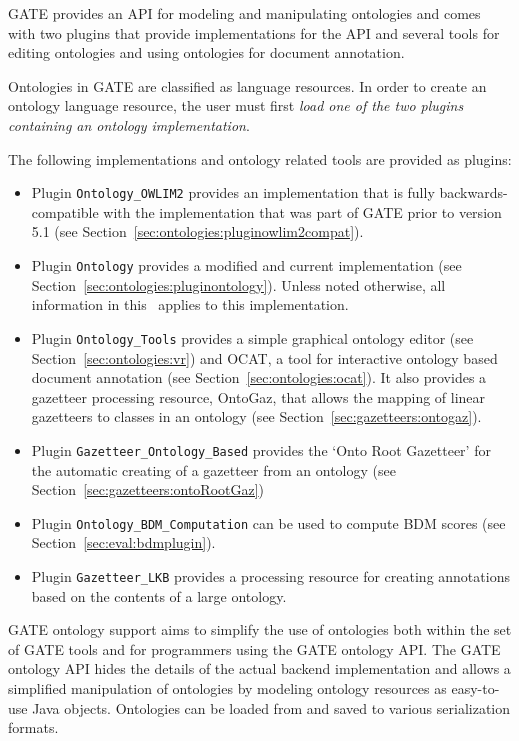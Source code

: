 

GATE provides an API for modeling and manipulating ontologies and 
comes with two plugins that provide implementations for the API  
and several tools for 
editing ontologies and using ontologies for document annotation. 


Ontologies in GATE are classified as language resources. In order to create 
an ontology language resource, the user must first  
\emph{load
one of the two plugins containing an ontology implementation}.

The following implementations and ontology related tools are provided 
as plugins:
\begin{itemize}
 \item Plugin \texttt{Ontology\_OWLIM2} provides an implementation that is fully
backwards-compatible with the implementation that was part of GATE 
prior to version 5.1 (see Section~\ref{sec:ontologies:pluginowlim2compat}). 
\item Plugin \texttt{Ontology} provides a modified and current implementation
(see Section~\ref{sec:ontologies:pluginontology}).
Unless noted otherwise, all information in this \chapthing\ applies to this
implementation.
\item Plugin \texttt{Ontology\_Tools} provides a simple graphical ontology 
editor (see Section~\ref{sec:ontologies:vr}) and OCAT, a tool for interactive ontology based
document annotation (see Section~\ref{sec:ontologies:ocat}). It also provides a gazetteer
processing resource, OntoGaz, that allows the mapping of linear 
gazetteers to classes in an ontology (see Section~\ref{sec:gazetteers:ontogaz}).
\item Plugin \texttt{Gazetteer\_Ontology\_Based} provides the `Onto Root
Gazetteer' for the automatic creating of a gazetteer from an ontology 
(see Section~\ref{sec:gazetteers:ontoRootGaz})
\item Plugin \texttt{Ontology\_BDM\_Computation} can be used to compute BDM
scores (see Section~\ref{sec:eval:bdmplugin}).
\item Plugin \texttt{Gazetteer\_LKB} provides a processing resource for
creating annotations based on the contents of a large ontology.
\end{itemize}

GATE ontology support aims to simplify the use of ontologies both 
within the set of GATE tools and for programmers using the GATE ontology
API. The GATE ontology API hides the details of the actual backend
implementation and allows a simplified manipulation of 
ontologies by modeling ontology resources as easy-to-use Java objects.
Ontologies can be loaded from and saved to various serialization 
formats. 

